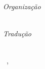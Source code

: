 {\centering\vspace*{10em}\thispagestyle{empty}
{\huge\titulo\par}}
\cleardoublepage
{\centering\vspace*{10em}\thispagestyle{empty}
{\huge\titulo\medskip\par}
{\Large\textls{\autor}\par}
\vspace*{8em}
{\textls{\organizador}}\\
{\small\textit{Organização}}\medskip\par
{\textls{\tradutor}}\\
{\small\textit{Tradução}}\par
\vfill\par
\logoum\\
{\normalsize\ \cidade, \ano}\par}
\clearpage
